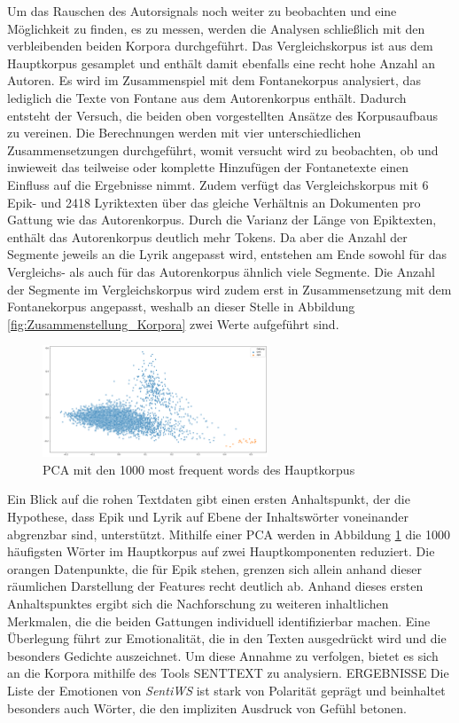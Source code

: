 \documentclass[a4paper,10p]{article}
\begin{document}
Um das Rauschen des Autorsignals noch weiter zu beobachten und eine Möglichkeit zu finden, es zu messen, werden die Analysen schließlich mit den verbleibenden beiden Korpora durchgeführt. Das Vergleichskorpus ist aus dem Hauptkorpus gesamplet und enthält damit ebenfalls eine recht hohe Anzahl an Autoren. Es wird im Zusammenspiel mit dem Fontanekorpus analysiert, das lediglich die Texte von Fontane aus dem Autorenkorpus enthält. Dadurch entsteht der Versuch, die beiden oben vorgestellten Ansätze des Korpusaufbaus zu vereinen. Die Berechnungen werden mit vier unterschiedlichen Zusammensetzungen durchgeführt, womit versucht wird zu beobachten, ob und inwieweit das teilweise oder komplette Hinzufügen der Fontanetexte einen Einfluss auf die Ergebnisse nimmt. Zudem verfügt das Vergleichskorpus mit 6 Epik- und 2418 Lyriktexten über das gleiche Verhältnis an Dokumenten pro Gattung wie das Autorenkorpus. Durch die Varianz der Länge von Epiktexten, enthält das Autorenkorpus deutlich mehr Tokens. Da aber die Anzahl der Segmente jeweils an die Lyrik angepasst wird, entstehen am Ende sowohl für das Vergleichs- als auch für das Autorenkorpus ähnlich viele Segmente. Die Anzahl der Segmente im Vergleichskorpus wird zudem erst in Zusammensetzung mit dem Fontanekorpus angepasst, weshalb an dieser Stelle in Abbildung \ref{fig:Zusammenstellung_Korpora} zwei Werte aufgeführt sind. \par

\begin{figure}
	\includegraphics[width=0.6\textwidth]{pca_mfw.png}
	\caption{PCA mit den 1000 most frequent words des Hauptkorpus}
	\label{fig:PCA_mfw}
\end{figure}

Ein Blick auf die rohen Textdaten gibt einen ersten Anhaltspunkt, der die Hypothese, dass Epik und Lyrik auf Ebene der Inhaltswörter voneinander abgrenzbar sind, unterstützt. Mithilfe einer PCA werden in Abbildung \ref{fig:PCA_mfw} die 1000 häufigsten Wörter im Hauptkorpus auf zwei Hauptkomponenten reduziert. Die orangen Datenpunkte, die für Epik stehen, grenzen sich allein anhand dieser räumlichen Darstellung der Features recht deutlich ab. Anhand dieses ersten Anhaltspunktes ergibt sich die Nachforschung zu weiteren inhaltlichen Merkmalen, die die beiden Gattungen individuell identifizierbar machen. Eine Überlegung führt zur Emotionalität, die in den Texten ausgedrückt wird und die besonders Gedichte auszeichnet. Um diese Annahme zu verfolgen, bietet es sich an die Korpora mithilfe des Tools SENTTEXT zu analysiern. ERGEBNISSE Die Liste der Emotionen von \textit{SentiWS} \citep{Sentiws} ist stark von Polarität geprägt und beinhaltet besonders auch Wörter, die den impliziten Ausdruck von Gefühl betonen. \par 
\end{document}
